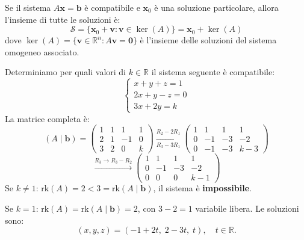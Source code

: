 \begin{theorembox}
\label{thm:struttura-soluzioni}
Se il sistema $A\mathbf{x} = \mathbf{b}$ è compatibile e $\mathbf{x}_0$ è una soluzione particolare, allora l'insieme di tutte le soluzioni è:
\[ \mathcal{S} = \{\mathbf{x}_0 + \mathbf{v} : \mathbf{v} \in \ker(A)\} = \mathbf{x}_0 + \ker(A) \]
dove $\ker(A) = \{\mathbf{v} \in \mathbb{R}^n : A\mathbf{v} = \mathbf{0}\}$ è l'insieme delle soluzioni del sistema omogeneo associato.
\end{theorembox}

\begin{examplebox}
Determiniamo per quali valori di $k \in \mathbb{R}$ il sistema seguente è compatibile:
\[
\begin{cases}
x + y + z = 1 \\
2x + y - z = 0 \\
3x + 2y = k
\end{cases}
\]
La matrice completa è:
\[ (A \mid \mathbf{b}) = \left( \begin{array}{ccc|c} 1 & 1 & 1 & 1 \\ 2 & 1 & -1 & 0 \\ 3 & 2 & 0 & k \end{array} \right) \xrightarrow[\scriptscriptstyle R_3 - 3R_1]{\scriptscriptstyle R_2 - 2R_1} \left( \begin{array}{ccc|c} 1 & 1 & 1 & 1 \\ 0 & -1 & -3 & -2 \\ 0 & -1 & -3 & k{-}3 \end{array} \right) \]
\[ \xrightarrow{R_3 \to R_3 - R_2} \left( \begin{array}{ccc|c} 1 & 1 & 1 & 1 \\ 0 & -1 & -3 & -2 \\ 0 & 0 & 0 & k-1 \end{array} \right) \]
Se $k \neq 1$: $\text{rk}(A) = 2 < 3 = \text{rk}(A \mid \mathbf{b})$, il sistema è \textbf{impossibile}.

Se $k = 1$: $\text{rk}(A) = \text{rk}(A \mid \mathbf{b}) = 2$, con $3 - 2 = 1$ variabile libera. Le soluzioni sono:
\[ (x, y, z) = (-1 + 2t, \; 2 - 3t, \; t), \quad t \in \mathbb{R}. \]
\end{examplebox}

